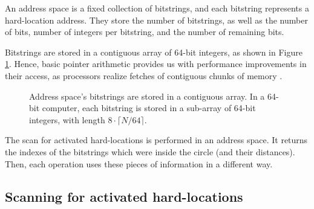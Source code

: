 An address space is a fixed collection of bitstrings, and each bitstring represents a hard-location address. They store the number of bitstrings, as well as the number of bits, number of integers per bitstring, and the number of remaining bits.

Bitstrings are stored in a contiguous array of 64-bit integers, as shown in Figure \ref{tab:hl-addresses-detail}. Hence, basic pointer arithmetic provides us with performance improvements in their access, as processors realize fetches of contiguous chunks of memory  \citep{pai2004linux}.

\begin{figure}
\centering
{}

\caption{Address space's bitstrings are stored in a contiguous array. In a 64-bit computer, each bitstring is stored in a sub-array of 64-bit integers, with length $8 \cdot \lceil N/64 \rceil$.\label{tab:hl-addresses-detail}}
\end{figure}

The scan for activated hard-locations is performed in an address space. It returns the indexes of the bitstrings which were inside the circle (and their distances). Then, each operation uses these pieces of information in a different way.

\subsection{Scanning for activated hard-locations}


